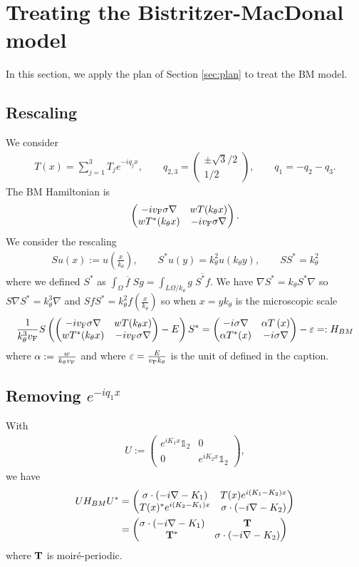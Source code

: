 \documentclass[11pt,a4paper,reqno,french,tikz]{amsart}
\newcommand{\pa}[1]{\left( #1 \right)} %
\newcommand{\na}{\nabla} %
\newcommand{\f}[2]{\frac{#1}{#2}} %
\newcommand{\ind}[1]{_{\textup{#1}}} %
\newcommand{\mat}[1]{\begin{pmatrix} #1 \end{pmatrix}} %
\def\1{{\mathds{1}}}
\def\1{{\mathds{1}}}
\begin{document}
\section{Treating the Bistritzer-MacDonal model}
\label{sec:comparision_between_bm_and_our_model}

In this section, we apply the plan of Section \ref{sec:plan} to treat the BM model.

\subsection{Rescaling}%
\label{sub:rescaling}

We consider 
\begin{align*}
T(x) = \sum_{j=1}^3 T_j e^{-i q_j x}, \qquad q_{2,3} = \mat{\pm \sqrt{3}/2 \\ 1/2}, \qquad q_1 = - q_2 - q_3.
\end{align*}
The BM Hamiltonian is
\begin{align*}
\mat{-i v\ind{F} \sigma \na & w T(k_\theta x) \\ w T^*(k_\theta x) & -iv\ind{F} \sigma \na}.
\end{align*}
We consider the rescaling
\begin{align*}
Su(x) := u\pa{\f{x}{k_\theta}}, \qquad S^*u(y) = k_\theta^2 u\pa{k_\theta y}, \qquad S S^* = k_\theta^2
\end{align*}
where we defined $S^*$ as $\int_\Omega \overline{f} \; Sg = \int_{L\Omega/k_\theta} g \; \overline{S^*f}$.
We have $\na S^* = k_\theta S^* \na$ so $S \na S^* = k_\theta^3 \na$ and $SfS^* = k_\theta^2 f\pa{\f{x}{k_\theta}}$ so when $x = y k_\theta$ is the microscopic scale
\begin{align}\label{def:conjugation}
	\f{1}{k_\theta^3 v\ind{F}} S \pa{\mat{-i v\ind{F} \sigma \na & w T(k_\theta x) \\ w T^*(k_\theta x) & -iv\ind{F} \sigma \na} -E} S^* = \mat{-i\sigma \na & \alpha T\pa{x} \\ \alpha T^*(x) & -i\sigma \na} - \ep =: H_{BM}
\end{align}
where $\alpha := \f{w}{k_\theta v\ind{F}}$ and where $\ep = \f{E}{v\ind{F} k_\theta}$ is the unit of \cite[Fig 1]{TarKruVis19} defined in the caption.

\subsection{Removing $e^{-iq_1 x}$}%


With 
\begin{align}\label{def:U}
U := \mat{e^{i K_1 x} \1_2 & 0 \\ 0 & e^{iK_2 x} \1_2 },
\end{align}
we have
\begin{align*}
U H_{BM} U^* &= \mat{\sigma \cdot \pa{-i\na  -  K_1} & T(x) e^{i\pa{ K_1 - K_2}x} \\ T(x)^*e^{i\pa{K_2 -  K_1}x} & \sigma\cdot \pa{-i\na  -K_2}} \\
		&= \mat{\sigma \cdot \pa{-i\na - K_1} & \bf{T} \\ \bf{T}^* & \sigma \cdot \pa{-i\na -K_2}}
\end{align*}
where $\bf{T}$ is moiré-periodic.
\end{document}
